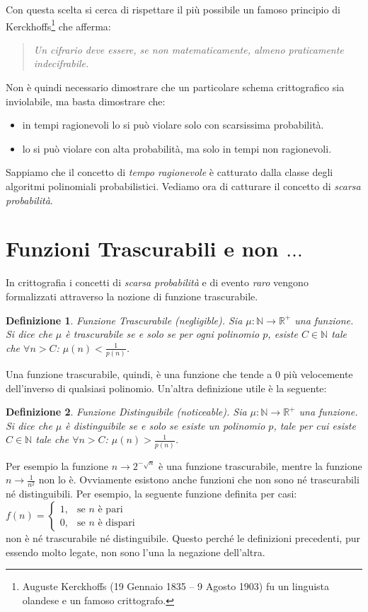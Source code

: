 \documentclass[a4paper,openright,twoside,12pt]{report}
\newtheorem{definizione}{Definizione}[chapter]
\begin{document}
Con questa scelta si cerca di rispettare il pi\`u possibile un famoso principio di Kerckhoffs\footnote{Auguste Kerckhoffs (19 Gennaio 1835 – 9 Agosto 1903) 
fu un linguista olandese e un famoso crittografo.} che afferma: 
\begin{quotation}
\em
Un cifrario deve essere, se non matematicamente, almeno praticamente indecifrabile.
\end{quotation}
Non \`e quindi necessario dimostrare che un particolare schema crittografico sia inviolabile, ma basta dimostrare che:
\begin{itemize}
 \item in tempi ragionevoli lo si pu\`o violare solo con scarsissima probabilit\`a.
 \item lo si pu\`o violare con alta probabilit\`a, ma solo in tempi non ragionevoli.
\end{itemize}
Sappiamo che il concetto di \emph{tempo ragionevole} \`e catturato dalla classe degli algoritmi polinomiali probabilistici. Vediamo ora di catturare il concetto di \emph{scarsa probabilit\`a}.
\section{Funzioni Trascurabili e non $\dots$}
In crittografia i concetti di \emph{scarsa probabilit\`a} e di evento \emph{raro} vengono formalizzati attraverso la nozione di funzione trascurabile.
\begin{definizione}{Funzione Trascurabile (negligible).}
Sia $\mu: \mathbb{N} \rightarrow \mathbb{R^{+}}$ una funzione. Si dice che $\mu$ \`e trascurabile se e solo se per ogni polinomio $p$, esiste $C \in \mathbb{N} $ tale che $\forall n>C$: $\mu(n) < \frac{1}{p(n)}$.  
\end{definizione}
Una funzione trascurabile, quindi, \`e una funzione che tende a 0 pi\`u velocemente dell'inverso di qualsiasi polinomio.
Un'altra definizione utile \`e la seguente:
\begin{definizione}{Funzione Distinguibile (noticeable).}
Sia $\mu: \mathbb{N} \rightarrow \mathbb{R^{+}}$ una funzione. Si dice che $\mu$ \`e distinguibile se e solo se esiste un polinomio $p$, tale per cui esiste $C \in \mathbb{N} $ tale che $\forall n>C$: $\mu(n) > \frac{1}{p(n)}$.  
\end{definizione}
Per esempio la funzione $n \rightarrow 2^{-\sqrt{n}}$ \`e una funzione trascurabile, mentre la funzione $n \rightarrow \frac{1}{n^2}$ non lo \`e. 
Ovviamente esistono anche funzioni che non sono n\'e trascurabili n\'e distinguibili. Per esempio, la seguente funzione definita per casi:
$f(n) = \begin{cases} 1, & \mbox{se } n\mbox{ \`e pari} \\ 0, & \mbox{se } n\mbox{ \`e dispari} \end{cases}$\\
non \`e n\'e trascurabile n\'e distinguibile. Questo perch\'e le definizioni precedenti, pur essendo molto legate, non sono l'una la negazione dell'altra.
\end{document}
